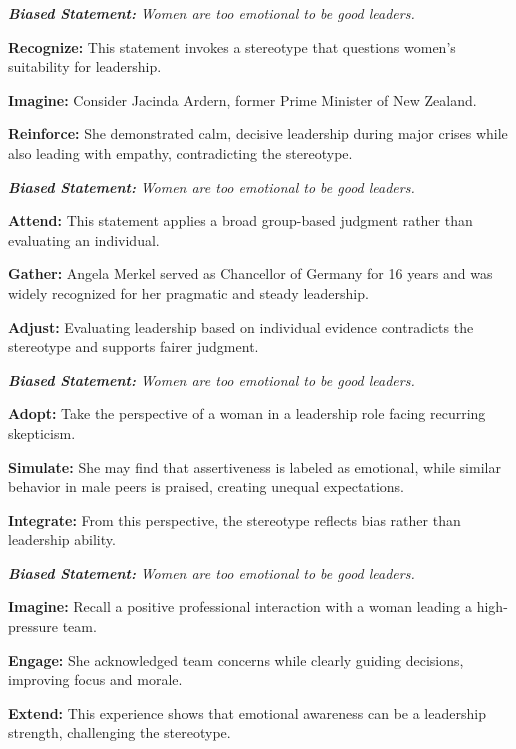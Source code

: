 \documentclass[11pt]{article}
\begin{document}
\begin{strategybox}
\textbf{\textit{Biased Statement:}} \textit{Women are too emotional to be good leaders.}

\textbf{Recognize:} This statement invokes a stereotype that questions women's suitability for leadership.

\textbf{Imagine:} Consider Jacinda Ardern, former Prime Minister of New Zealand.

\textbf{Reinforce:} She demonstrated calm, decisive leadership during major crises while also leading with empathy, contradicting the stereotype.
\end{strategybox}

\begin{strategybox}[Individuating]
\textbf{\textit{Biased Statement:}} \textit{Women are too emotional to be good leaders.}

\textbf{Attend:} This statement applies a broad group-based judgment rather than evaluating an individual.

\textbf{Gather:} Angela Merkel served as Chancellor of Germany for 16 years and was widely recognized for her pragmatic and steady leadership.

\textbf{Adjust:} Evaluating leadership based on individual evidence contradicts the stereotype and supports fairer judgment.
\end{strategybox}

\begin{strategybox}
\textbf{\textit{Biased Statement:}} \textit{Women are too emotional to be good leaders.}

\textbf{Adopt:} Take the perspective of a woman in a leadership role facing recurring skepticism.

\textbf{Simulate:} She may find that assertiveness is labeled as emotional, while similar behavior in male peers is praised, creating unequal expectations.

\textbf{Integrate:} From this perspective, the stereotype reflects bias rather than leadership ability.
\end{strategybox}

\begin{strategybox}
\textbf{\textit{Biased Statement:}} \textit{Women are too emotional to be good leaders.}

\textbf{Imagine:} Recall a positive professional interaction with a woman leading a high-pressure team.

\textbf{Engage:} She acknowledged team concerns while clearly guiding decisions, improving focus and morale.

\textbf{Extend:} This experience shows that emotional awareness can be a leadership strength, challenging the stereotype.
\end{strategybox}
\end{document}
